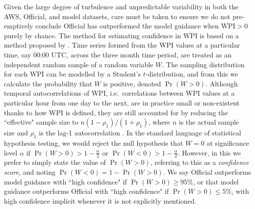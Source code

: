 \documentclass[twocol]{ametsoc}
\DeclareMathOperator{\pr}{Pr}
\begin{document}
Given the large degree of turbulence and unpredictable variability in both the AWS, Official, and model datasets, care must be taken to ensure we do not pre-emptively conclude Official has outperformed the model guidance when $\overline{\text{WPI}}>0$ purely by chance. The method for estimating confidence in $\overline{\text{WPI}}$ is based on a method proposed by \citet{griffiths17}. Time series formed from the WPI values at a particular time, say 00:00 UTC, across the three month time period, are treated as an independent random sample of a random variable $W$. The sampling distribution for each $\overline{\text{WPI}}$ can be modelled by a Student's $t$-distribution, and from this we calculate the probability that $W$ is positive, denoted $\pr\left(W > 0\right)$. Although temporal autocorrelations of WPI, i.e.~correlations between WPI values at a particular hour from one day to the next, are in practice small or non-existent thanks to how WPI is defined, they are still accounted for by reducing the ``effective" sample size to $ n \left(1-\rho_1\right)/\left(1+\rho_1\right)$, where $n$ is the actual sample size and $\rho_1$ is the lag-1 autocorrelation \citep{zwiers95,wilks11}. In the standard language of statistical hypothesis testing, we would reject the null hypothesis that $W=0$ at significance level $\alpha$ if $\pr(W>0) > 1-\frac{\alpha}{2}$ or $\pr(W<0) > 1-\frac{\alpha}{2}$. However, in this we prefer to simply state the value of $\pr(W>0)$, referring to this as a \textit{confidence score}, and noting $\pr(W<0) = 1- \pr(W>0)$. We say Official outperforms model guidance with ``high confidence" if $\pr(W>0) \geq 95\%$, or that model guidance outperforms Official with ``high confidence" if $\pr(W>0) \leq 5\%$, with high confidence implicit whenever it is not explicitly mentioned.
\end{document}
